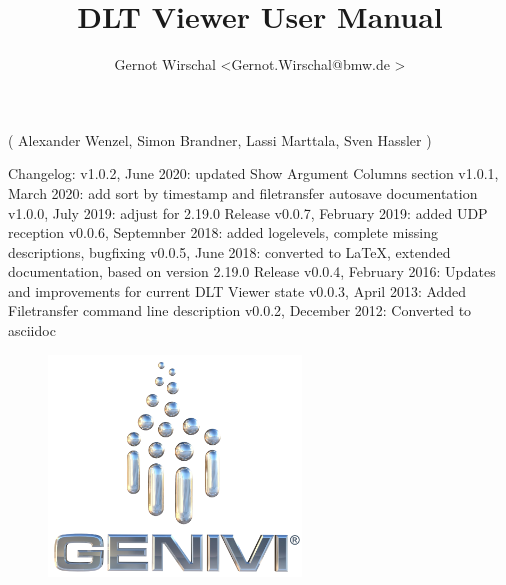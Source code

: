 \documentclass[a4paper,11pt]{article}
\begin{document}
\title{DLT Viewer User Manual}
\author{Gernot Wirschal \textless Gernot.Wirschal@bmw.de \textgreater }


\maketitle

\begin{center}
( Alexander Wenzel, Simon Brandner, Lassi Marttala, Sven Hassler ) \linebreak
\end{center}

Changelog:\linebreak
v1.0.2, June 2020: updated Show Argument Columns section\linebreak
v1.0.1, March 2020: add sort by timestamp and filetransfer autosave documentation\linebreak
v1.0.0, July 2019: adjust for 2.19.0 Release\linebreak
v0.0.7, February 2019: added UDP reception\linebreak
v0.0.6, Septemnber 2018: added logelevels, complete missing descriptions, bugfixing \linebreak
v0.0.5, June 2018: converted to \LaTeX, extended documentation, based on version 2.19.0 Release \linebreak
v0.0.4, February 2016: Updates and improvements for current DLT Viewer state \linebreak
v0.0.3, April 2013: Added Filetransfer command line description \linebreak
v0.0.2, December 2012: Converted to asciidoc \linebreak

\vspace{3cm}

\begin{figure}[h]
    \centering
    \includegraphics[width=0.6\textwidth]{images/genivi_transparent.png}
\end{figure}
\end{document}
